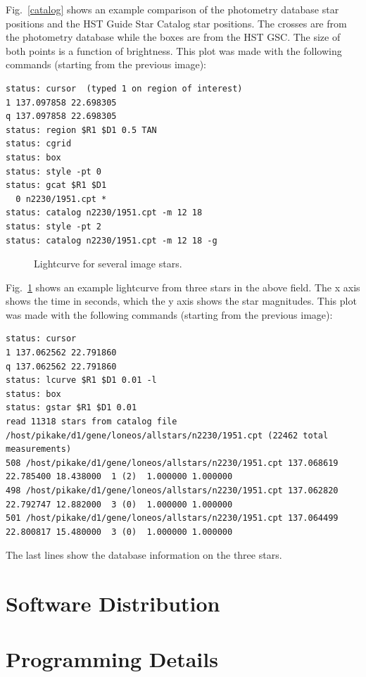 \documentclass{article}
\begin{document}
Fig.~\ref{catalog} shows an example comparison of the photometry
database star positions and the HST Guide Star Catalog star
positions.  The crosses are from the photometry database while the
boxes are from the HST GSC.  The size of both points is a function of
brightness.  This plot was made with the following commands (starting
from the previous image):
\begin{verbatim}
status: cursor  (typed 1 on region of interest)
1 137.097858 22.698305
q 137.097858 22.698305
status: region $R1 $D1 0.5 TAN
status: cgrid
status: box
status: style -pt 0 
status: gcat $R1 $D1 
  0 n2230/1951.cpt *
status: catalog n2230/1951.cpt -m 12 18
status: style -pt 2
status: catalog n2230/1951.cpt -m 12 18 -g
\end{verbatim}

\begin{figure}
\caption{\label{lightcurve} 
Lightcurve for several image stars.
}
\end{figure}

Fig.~\ref{lightcurve} shows an example lightcurve from three stars in
the above field.  The x axis shows the time in seconds, which the y
axis shows the star magnitudes.  This plot was made with the following commands (starting
from the previous image):
{\small
\begin{verbatim}
status: cursor
1 137.062562 22.791860
q 137.062562 22.791860
status: lcurve $R1 $D1 0.01 -l
status: box
status: gstar $R1 $D1 0.01
read 11318 stars from catalog file /host/pikake/d1/gene/loneos/allstars/n2230/1951.cpt (22462 total measurements)
508 /host/pikake/d1/gene/loneos/allstars/n2230/1951.cpt 137.068619 22.785400 18.438000  1 (2)  1.000000 1.000000
498 /host/pikake/d1/gene/loneos/allstars/n2230/1951.cpt 137.062820 22.792747 12.882000  3 (0)  1.000000 1.000000
501 /host/pikake/d1/gene/loneos/allstars/n2230/1951.cpt 137.064499 22.800817 15.480000  3 (0)  1.000000 1.000000
\end{verbatim}}
The last lines show the database information on the three stars.  

\section{Software Distribution}

\section{Programming Details}
\end{document}
